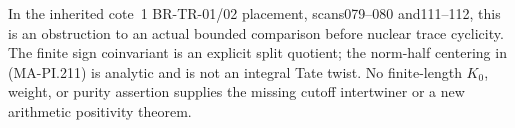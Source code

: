 In the inherited cote~1 BR-TR-01/02 placement,
scans079--080 and111--112, this is an obstruction to an
actual bounded comparison before nuclear trace cyclicity.
The finite sign coinvariant is an explicit split quotient;
the norm-half centering in (MA-PI.211) is analytic and is
not an integral Tate twist.  No finite-length \(K_0\),
weight, or purity assertion supplies the missing cutoff
intertwiner or a new arithmetic positivity theorem.
